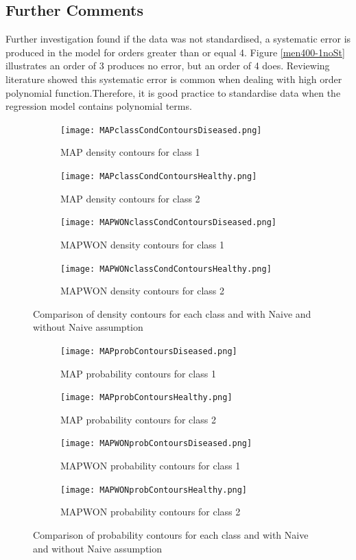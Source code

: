 {{	\subsection{Further Comments}
	Further investigation found if the data was not standardised, a systematic error is produced in the model for orders greater than or equal 4. Figure \ref{men400-1noSt} illustrates an order of 3 produces no error, but an order of 4 does. Reviewing literature showed this systematic error is common when dealing with high order polynomial function\cite{WhenIsIt}.Therefore, it is good practice to standardise data when the regression model contains polynomial terms.
	
	\begin{figure}[h!] 
		\centering
		\begin{subfigure}[b]{.49\textwidth}
			\texttt{[image: MAPclassCondContoursDiseased.png]}
			\caption{MAP density contours for class 1}
			\label{fig:model0}
		\end{subfigure}
		\begin{subfigure}[b]{.49\textwidth}
			\texttt{[image: MAPclassCondContoursHealthy.png]}
			\caption{MAP density contours for class 2}
			\label{fig:model1}
		\end{subfigure}
		\begin{subfigure}[b]{.49\textwidth}
			\texttt{[image: MAPWONclassCondContoursDiseased.png]}
			\caption{MAPWON density contours for class 1}
			\label{fig:model2}
		\end{subfigure}
		\begin{subfigure}[b]{.49\textwidth}
			\texttt{[image: MAPWONclassCondContoursHealthy.png]}
			\caption{MAPWON density contours for class 2}
			\label{fig:model3}
		\end{subfigure}
		\caption{Comparison of density contours for each class and with Naive and without Naive assumption}
		\label{fig:CMAPdens}
	\end{figure}
	
	\begin{figure}[h!] 
		\centering
		\begin{subfigure}[b]{.49\textwidth}
			\texttt{[image: MAPprobContoursDiseased.png]}
			\caption{MAP probability contours for class 1}
			\label{fig:model0}
		\end{subfigure}
		\begin{subfigure}[b]{.49\textwidth}
			\texttt{[image: MAPprobContoursHealthy.png]}
			\caption{MAP probability contours for class 2}
			\label{fig:model1}
		\end{subfigure}
		\begin{subfigure}[b]{.49\textwidth}
			\texttt{[image: MAPWONprobContoursDiseased.png]}
			\caption{MAPWON probability contours for class 1}
			\label{fig:model2}
		\end{subfigure}
		\begin{subfigure}[b]{.49\textwidth}
			\texttt{[image: MAPWONprobContoursHealthy.png]}
			\caption{MAPWON probability contours for class 2}
			\label{fig:model3}
		\end{subfigure}
		\caption{Comparison of probability contours for each class and with Naive and without Naive assumption}
		\label{fig:CMAPprob}
	\end{figure}
	
}}
